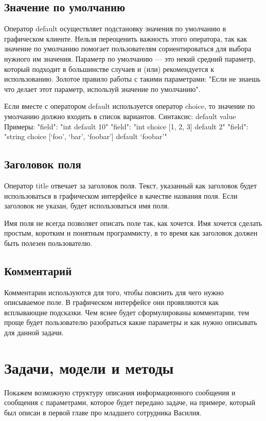 \subsection{Значение по умолчанию}

Оператор default осуществляет подстановку значения по умолчанию в графическом клиенте. Нельзя переоценить важность этого оператора, так как значение по умолчанию помогает пользователям сориентироваться для выбора нужного им значения. Параметр по умолчанию — это некий средний параметр, который подходит в большинстве случаев и (или) рекомендуется к использованию. Золотое правило работы с такими параметрами: "Если не знаешь что делает этот параметр, используй значение по умолчанию".

Если вместе с оператором default используется оператор choice, то значение по умолчанию должно входить в список вариантов.
Синтаксис:
        default value
Примеры:
"field": "int default 10"
"field": "int choice [1, 2, 3] default 2"
"field": "string choice [‘foo’, ‘bar’, ‘foobar’]
default ‘foobar’"

\subsection{Заголовок поля}

Оператор title отвечает за заголовок поля. Текст, указанный как заголовок будет использоваться в графическом интерфейсе в качестве названия поля. Если заголовок не указан, будет использоваться имя поля.

Имя поля не всегда позволяет описать поле так, как хочется. Имя хочется сделать простым, коротким и понятным программисту, в то время как заголовок должен быть полезен пользователю.

\subsection{Комментарий}

Комментарии используются для того, чтобы пояснить для чего нужно описываемое поле. В графическом интерфейсе они проявляются как всплывающие подсказки. Чем яснее будет сформулированы комментарии, тем проще будет пользователю разобраться какие параметры и как нужно описывать для данной задачи.

\section{Задачи, модели и методы}

Покажем возможную структуру описания информационного сообщения и сообщения с параметрами, которое будет передано задаче, на примере, который был описан в первой главе про младшего сотрудника Василия.

